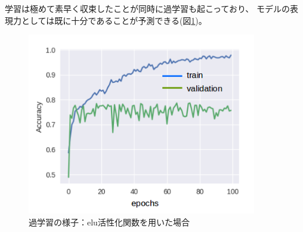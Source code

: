 学習は極めて素早く収束したことが同時に過学習も起こっており、
モデルの表現力としては既に十分であることが予測できる(図\ref{fig:overfit2})。

\begin{figure}[t]
    \centering
    \includegraphics[width=10cm]{images/overfitting.png}
    \caption{過学習の様子：elu活性化関数を用いた場合}
    \label{fig:overfit2}
\end{figure}




